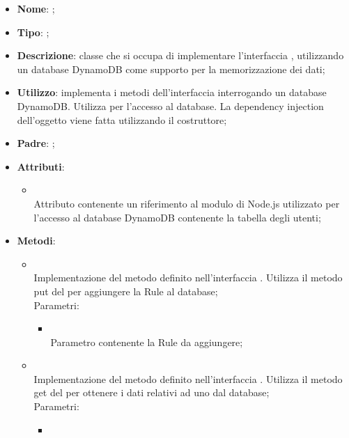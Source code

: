 \begin{itemize}
	\item \textbf{Nome}: ;
	\item \textbf{Tipo}: ;
	\item \textbf{Descrizione}: classe che si occupa di implementare l'interfaccia , utilizzando un database DynamoDB come supporto per la memorizzazione dei dati;
	\item \textbf{Utilizzo}: implementa i metodi dell'interfaccia  interrogando un database DynamoDB. Utilizza  per l'accesso al database. La dependency injection dell'oggetto  viene fatta utilizzando il costruttore;
	\item \textbf{Padre}: ;
	\item \textbf{Attributi}:
	\begin{itemize}
		\item[]  \\
		Attributo contenente un riferimento al modulo di Node.js utilizzato per l'accesso al database DynamoDB contenente la tabella degli utenti;
	\end{itemize}
	\item \textbf{Metodi}:
	\begin{itemize}
		\item[]  \\
		Implementazione del metodo definito nell'interfaccia . Utilizza il metodo put del  per aggiungere la Rule al database;\\
		Parametri:
		\begin{itemize}
			\item {} \\
			Parametro contenente la Rule da aggiungere;
		\end{itemize}
		\item[]  \\
		Implementazione del metodo definito nell'interfaccia . Utilizza il metodo get del  per ottenere i dati relativi ad uno  dal database;\\
		Parametri:
		\begin{itemize}
			\item {} \\

\end{itemize}
\end{itemize}
\end{itemize}
